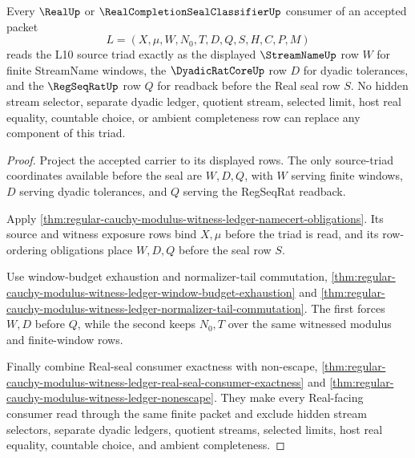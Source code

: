 \begin{theorem}
\label{thm:regular-cauchy-modulus-witness-ledger-source-triad-exactness}
Every $\RealUp$ or $\RealCompletionSealClassifierUp$ consumer of an accepted packet
$$
L=(X,\mu,W,N_0,T,D,Q,S,H,C,P,M)
$$
reads the L10 source triad exactly as the displayed $\StreamNameUp$ row $W$ for finite StreamName windows, the $\DyadicRatCoreUp$ row $D$ for dyadic tolerances, and the $\RegSeqRatUp$ row $Q$ for readback before the Real seal row $S$. No hidden stream selector, separate dyadic ledger, quotient stream, selected limit, host real equality, countable choice, or ambient completeness row can replace any component of this triad.
\end{theorem}
\begin{proof}
Project the accepted carrier to its displayed rows. The only source-triad coordinates available before the seal are $W,D,Q$, with $W$ serving finite windows, $D$ serving dyadic tolerances, and $Q$ serving the RegSeqRat readback.

Apply \autoref{thm:regular-cauchy-modulus-witness-ledger-namecert-obligations}. Its source and witness exposure rows bind $X,\mu$ before the triad is read, and its row-ordering obligations place $W,D,Q$ before the seal row $S$.

Use window-budget exhaustion and normalizer-tail commutation, \autoref{thm:regular-cauchy-modulus-witness-ledger-window-budget-exhaustion} and \autoref{thm:regular-cauchy-modulus-witness-ledger-normalizer-tail-commutation}. The first forces $W,D$ before $Q$, while the second keeps $N_0,T$ over the same witnessed modulus and finite-window rows.

Finally combine Real-seal consumer exactness with non-escape, \autoref{thm:regular-cauchy-modulus-witness-ledger-real-seal-consumer-exactness} and \autoref{thm:regular-cauchy-modulus-witness-ledger-nonescape}. They make every Real-facing consumer read through the same finite packet and exclude hidden stream selectors, separate dyadic ledgers, quotient streams, selected limits, host real equality, countable choice, and ambient completeness.
\end{proof}

